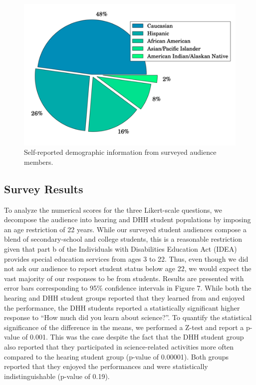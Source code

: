 \documentclass[11.5pt]{sig-alternate} %
\begin{document}
\begin{large}
\begin{figure}[!h]
     \centering
     \includegraphics[width=1\linewidth]{Fig_6.png}
     \caption{Self-reported demographic information from surveyed audience members.}
 \end{figure} 

\subsection*{Survey Results}

To analyze the numerical scores for the three Likert-scale questions, we decompose the audience into hearing and DHH student populations by imposing an age restriction of 22 years.  While our surveyed student audiences compose a blend of secondary-school and college students, this is a reasonable restriction given that part b of the Individuals with Disabilities Education Act (IDEA) provides special education services from ages 3 to 22.  Thus, even though we did not ask our audience to report student status below age 22, we would expect the vast majority of our responses to be from students.  Results are presented with error bars corresponding to 95\% confidence intervals in Figure 7.  While both the hearing and DHH student groups reported that they learned from and enjoyed the performance, the DHH students reported a statistically significant higher response to “How much did you learn about science?”.  To quantify the statistical significance of the difference in the means, we performed a Z-test and report a p-value of 0.001.  This was the case despite the fact that the DHH student group also reported that they participated in science-related activities more often compared to the hearing student group (p-value of 0.00001).  Both groups reported that they enjoyed the performances and were statistically indistinguishable (p-value of 0.19).


\end{large}
\end{document}
